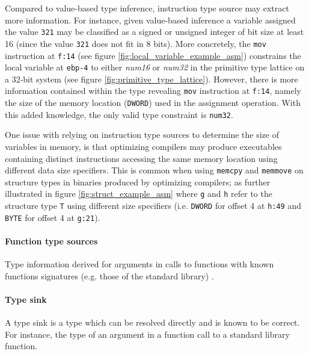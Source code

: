 Compared to value-based type inference, instruction type source may extract more information. For instance, given value-based inference a variable assigned the value \texttt{321} may be classified as a signed or unsigned integer of bit size at least 16 (since the value \texttt{321} does not fit in 8 bits). More concretely, the \texttt{mov} instruction at \texttt{f:14} (see figure \ref{fig:local_variable_example_asm}) constrains the local variable at \texttt{ebp-4} to either \textit{num16} or \textit{num32} in the primitive type lattice on a 32-bit system (see figure \ref{fig:primitive_type_lattice}). However, there is more information contained within the type revealing \texttt{mov} instruction at \texttt{f:14}, namely the size of the memory location (\texttt{DWORD}) used in the assignment operation. With this added knowledge, the only valid type constraint is \texttt{num32}.

One issue with relying on instruction type sources to determine the size of variables in memory, is that optimizing compilers may produce executables containing distinct instructions accessing the same memory location using different data size specifiers. This is common when using \texttt{memcpy} and \texttt{memmove} on structure types in binaries produced by optimizing compilers; as further illustrated in figure \ref{fig:struct_example_asm} where \texttt{g} and \texttt{h} refer to the structure type \texttt{T} using different size specifiers (i.e. \texttt{DWORD} for offset 4 at \texttt{h:49} and \texttt{BYTE} for offset 4 at \texttt{g:21}).


\paragraph{Function type sources}

Type information derived for arguments in calls to functions with known functions signatures (e.g. those of the standard library) \cite{type_inference_on_executables}.


\paragraph{Type sink}

A type sink is a type which can be resolved directly and is known to be correct. For instance, the type of an argument in a function call to a standard library function.

